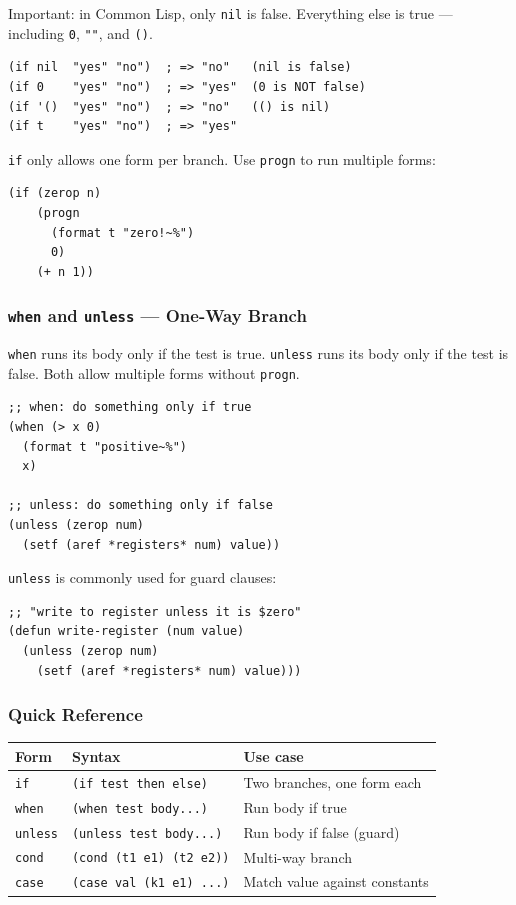 Important: in Common Lisp, only \texttt{nil} is false.
Everything else is true --- including \texttt{0}, \texttt{""}, and
\texttt{()}.

\begin{lstlisting}
(if nil  "yes" "no")  ; => "no"   (nil is false)
(if 0    "yes" "no")  ; => "yes"  (0 is NOT false)
(if '()  "yes" "no")  ; => "no"   (() is nil)
(if t    "yes" "no")  ; => "yes"
\end{lstlisting}

\texttt{if} only allows one form per branch. Use \texttt{progn} to
run multiple forms:

\begin{lstlisting}
(if (zerop n)
    (progn
      (format t "zero!~%")
      0)
    (+ n 1))
\end{lstlisting}

\subsubsection{\texttt{when} and \texttt{unless} --- One-Way Branch}

\texttt{when} runs its body only if the test is true.
\texttt{unless} runs its body only if the test is false.
Both allow multiple forms without \texttt{progn}.

\begin{lstlisting}
;; when: do something only if true
(when (> x 0)
  (format t "positive~%")
  x)

;; unless: do something only if false
(unless (zerop num)
  (setf (aref *registers* num) value))
\end{lstlisting}

\texttt{unless} is commonly used for guard clauses:

\begin{lstlisting}
;; "write to register unless it is $zero"
(defun write-register (num value)
  (unless (zerop num)
    (setf (aref *registers* num) value)))
\end{lstlisting}

\subsubsection{Quick Reference}

\begin{center}
\begin{tabular}{llp{5cm}}
  \toprule
  \textbf{Form} & \textbf{Syntax} & \textbf{Use case} \\
  \midrule
  \texttt{if}     & \texttt{(if test then else)} & Two branches, one form each \\
  \texttt{when}   & \texttt{(when test body...)} & Run body if true \\
  \texttt{unless} & \texttt{(unless test body...)} & Run body if false (guard) \\
  \texttt{cond}   & \texttt{(cond (t1 e1) (t2 e2))} & Multi-way branch \\
  \texttt{case}   & \texttt{(case val (k1 e1) ...)} & Match value against constants \\
  \bottomrule
\end{tabular}
\end{center}

